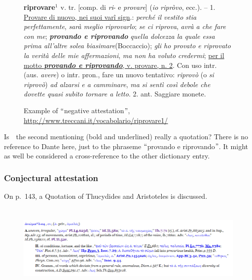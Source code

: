 \documentclass[10pt]{article}
\begin{document}
\begin{figure}[H]
 \textbf{\textcolor[HTML]{3E3F3E}{riprovare$^1$ }}\textcolor[HTML]{3E3F3E}{ v. tr. [comp. di \textit{ri}- e \textit{provare}] (\textit{io ripròvo}, ecc.). – 1. \uline{Provare di nuovo, nei suoi varî sign}.: \textit{perché il vestito stia perfettamente}, \textit{sarà meglio riprovarlo}; \textit{se ci riprova}, \textit{avrà a che fare con me}; \textbf{\textit{provando e riprovando}}\textit{ quella dolcezza la quale essa prima all’altre solea biasimare}(Boccaccio); \textit{gli ho provato e riprovato la verità delle mie affermazioni}, \textit{ma non ha voluto credermi}; \uline{per il motto \textbf{\textit{provando e riprovando}}, v. provare, n. 2}. Con uso intr. (aus. \textit{avere}) o intr. pron., fare un nuovo tentativo: \textit{riprovò} (o \textit{si riprovò}) \textit{ad alzarsi e a camminare}, \textit{ma si sentì così debole che dovette quasi subito tornare a letto}. 2. ant. Saggiare monete.}\par

 \caption{Example of $``$negative attestation$"$, \textcolor[HTML]{3E3F3E}{\href{http://www.treccani.it/vocabolario/riprovare1/}{\uline{http://www.treccani.it/vocabolario/riprovare1/}}}}

\end{figure}

 Is\ \ the second mentioning (bold and underlined)  really a quotation? There is no reference to Dante here, just to the phraseme $``$provando e riprovando$"$. It might as well be considered a cross-reference to the other dictionary entry.\par



\subsubsection*{Conjectural attestation}
 On p.~143,  a Quotation of Thucydides and Aristoteles is discussed. \par








\begin{figure}[H]
\advance\leftskip 0.12in		\includegraphics[width=6.27in,height=1.69in]{./image13.png}
\end{figure}
\end{document}
